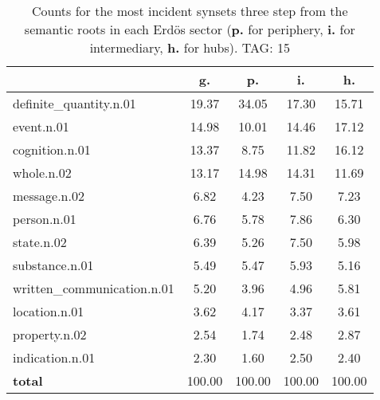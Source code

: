 \begin{table}[h!]
\begin{center}
\begin{tabular}{| l | c | c | c | c |}\hline
 & g. & p. & i. & h. \\\hline
definite\_quantity.n.01 & 19.37  & 34.05  & 17.30  & 15.71 \\\hline
event.n.01 & 14.98  & 10.01  & 14.46  & 17.12 \\\hline
cognition.n.01 & 13.37  & 8.75  & 11.82  & 16.12 \\\hline
whole.n.02 & 13.17  & 14.98  & 14.31  & 11.69 \\\hline
message.n.02 & 6.82  & 4.23  & 7.50  & 7.23 \\\hline
person.n.01 & 6.76  & 5.78  & 7.86  & 6.30 \\\hline
state.n.02 & 6.39  & 5.26  & 7.50  & 5.98 \\\hline
substance.n.01 & 5.49  & 5.47  & 5.93  & 5.16 \\\hline
written\_communication.n.01 & 5.20  & 3.96  & 4.96  & 5.81 \\\hline
location.n.01 & 3.62  & 4.17  & 3.37  & 3.61 \\\hline
property.n.02 & 2.54  & 1.74  & 2.48  & 2.87 \\\hline
indication.n.01 & 2.30  & 1.60  & 2.50  & 2.40 \\\hline
{{\bf total}} & 100.00  & 100.00  & 100.00  & 100.00 \\\hline
\end{tabular}
\caption{Counts for the most incident synsets three step from the semantic roots in each Erd\"os sector ({\bf p.} for periphery, {\bf i.} for intermediary, {\bf h.} for hubs). TAG: 15}
\end{center}
\end{table}
